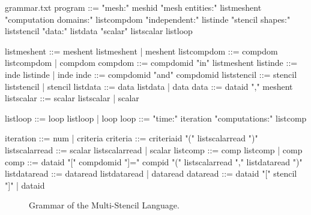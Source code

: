 \begin{filecontents*}{grammar.txt}
program ::= "mesh:" meshid 
            "mesh entities:" listmeshent
            "computation domains:" 
                      listcompdom
            "independent:"
                      listinde
            "stencil shapes:"
                      liststencil
            "data:" listdata
            "scalar" listscalar
            listloop

listmeshent ::= meshent listmeshent 
                        |  meshent
listcompdom ::= compdom listcompdom 
                        |  compdom
compdom ::= compdomid "in" listmeshent
listinde ::= inde listinde |  inde
inde ::= compdomid "and" compdomid
liststencil ::= stencil liststencil 
                        | stencil
listdata ::= data listdata |  data
data ::= dataid "," meshent
listscalar ::= scalar listscalar 
                      | scalar

listloop ::= loop listloop | loop
loop ::=  "time:" iteration
          "computations:" listcomp
          
iteration ::= num | criteria
criteria ::= criteriaid "(" listscalarread ")"
listscalarread ::= scalar listscalarread 
                          |  scalar
listcomp ::= comp listcomp |  comp
comp ::= dataid "[" compdomid "]=" 
                    compid "(" 
                    listscalarread "," 
                    listdataread ")"
listdataread ::= dataread listdataread 
                          |  dataread
dataread ::= dataid "[" stencil "]" 
              |  dataid
\end{filecontents*}

\begin{figure}[!h]
  \hspace{5mm}
  \begin{minipage}[!h]{0.5\textwidth}
    {}   
    \caption{Grammar of the Multi-Stencil Language. \label{fig:grammar}}
  \end{minipage}
\end{figure}